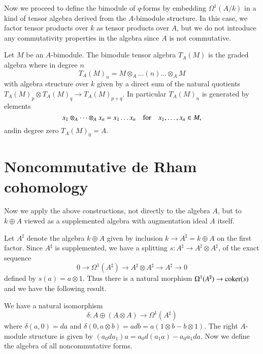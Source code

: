 Now we proceed to define the bimodule of $q$-forms by embedding
$\Omega^{1}(A/k)$ in a kind of tensor algebra derived from the
$A$-bimodule structure. In this case, we factor tensor products over
$k$ as tensor products over $A$, but we do not introduce any
commutativity properties in the algebra since $A$ is not commutative.

\begin{definition}\label{chap7-defi1.6}
Let $M$ be an $A$-bimodule. The bimodule tensor algebra $T_{A}(M)$ is
the graded algebra where in degree $n$
$$
T_{A}(M)_{n}=M\otimes_{A}\ldots (n)\ldots \otimes_{A}M
$$
with algebra structure over $k$ given by a direct sum of the natural
quotients $T_{A}(M)_{p}\otimes T_{A}(M)_{q}\to T_{A}(M)_{p+q}$. In
particular $T_{A}(M)_{n}$ is generated by elements
$$
x_{1}\otimes_{A}\cdots\otimes_{A}x_{n}=x_{1}\ldots x_{n}\quad\text{for}\quad
x_{1},\ldots,x_{n}\in M,
$$
and\pageoriginale in degree zero $T_{A}(M)_{0}=A$.
\end{definition}

\section{Noncommutative de Rham cohomology}\label{chap7-sec2}

Now we apply the above constructions, not directly to the algebra $A$,
but to $k\oplus A$ viewed as a supplemented algebra with augmentation
ideal $A$ itself.

\begin{notation}\label{chap7-not2.1}
Let $A^{\sharp}$ denote the algebra $k\oplus A$ given by inclusion
$k\to A^{\sharp}=k\oplus A$ on the first factor. Since $A^{\sharp}$ is
supplemented, we have a splitting $s:A^{\sharp}\to A^{\sharp}\otimes
A^{\sharp}$, of the exact sequence
$$
0\to \Omega^{1}(A^{\sharp})\to A^{\sharp}\otimes A^{\sharp}\to
A^{\sharp}\to 0
$$
defined by $s(a)=a\otimes 1$. Thus there is a natural morphism
$\Omega^{1}(A^{\sharp})\to \operatorname{coker}(s)$ and we have the following result.
\end{notation}

\begin{proposition}\label{chap7-prop2.2}
We have a natural isomorphism
$$
\delta:A\oplus (A\otimes A)\to \Omega^{1}(A^{\sharp})
$$
where $\delta(a,0)=da$ and $\delta(0,a\otimes b)=adb=a(1\otimes
b-b\otimes 1)$. The right $A$-module structure is given by
$(a_{0}da_{1})a=a_{0}d(a_{1}a)-a_{0}a_{1}da$. Now we define the
algebra of all noncommutative forms.
\end{proposition}

